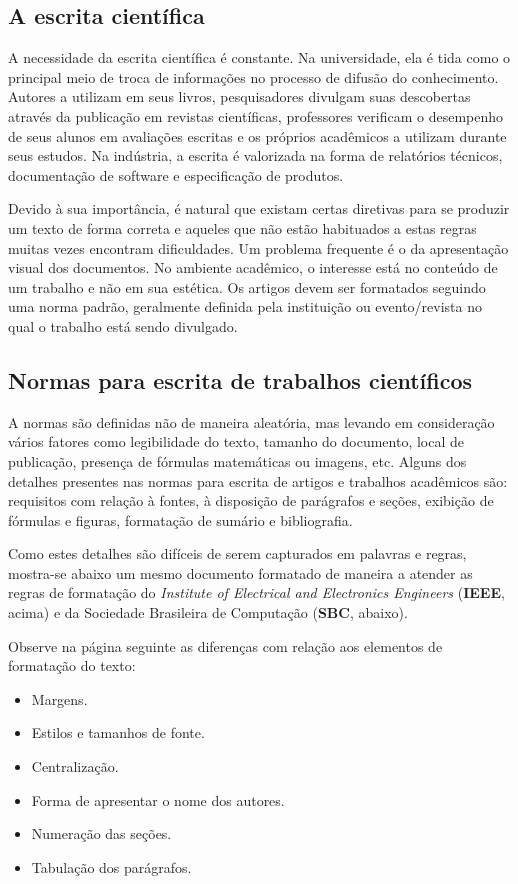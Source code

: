 \subsection{A escrita científica}
A necessidade da escrita científica é constante. Na universidade, ela é tida como o principal meio de troca de informações %
no processo de difusão do conhecimento. Autores a utilizam em seus livros, pesquisadores divulgam suas descobertas através da publicação em revistas científicas, professores verificam o desempenho de seus alunos em avaliações escritas e os próprios acadêmicos a utilizam durante seus estudos. Na indústria, a escrita é valorizada na forma de relatórios técnicos, documentação de software e especificação de produtos.

Devido à sua importância, é natural que existam certas diretivas para se produzir um texto de forma correta e aqueles que não estão habituados a estas regras muitas vezes encontram dificuldades. Um problema frequente é o da apresentação visual dos documentos. No ambiente acadêmico, o interesse está no conteúdo de um trabalho e não em sua estética. Os artigos devem ser formatados seguindo uma norma padrão, geralmente definida pela instituição ou evento/revista no qual o trabalho está sendo divulgado. 

\subsection{Normas para escrita de trabalhos científicos}
A normas são definidas não de maneira aleatória, mas levando em consideração vários fatores como legibilidade do texto, tamanho do documento, local de publicação, presença de fórmulas matemáticas ou imagens, etc. Alguns dos detalhes presentes nas normas para escrita de artigos e trabalhos acadêmicos são: requisitos com relação à fontes, à disposição de parágrafos e seções, exibição de fórmulas e figuras, formatação de sumário e bibliografia.

Como estes detalhes são difíceis de serem capturados em palavras e regras, mostra-se abaixo um mesmo documento formatado de maneira a atender as regras de formatação do {\slshape Institute of Electrical and Electronics Engineers} (\textbf{IEEE}, acima) e da Sociedade Brasileira de Computação (\textbf{SBC}, abaixo).

Observe na página seguinte as diferenças com relação aos elementos de formatação do texto:
\begin{itemize}
\item Margens.
\item Estilos e tamanhos de fonte.
\item Centralização.
\item Forma de apresentar o nome dos autores.
\item Numeração das seções.
\item Tabulação dos parágrafos.
\end{itemize}

